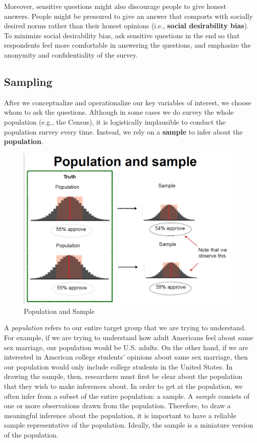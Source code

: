 \documentclass{book}
\begin{document}
Moreover, sensitive questions might also discourage people to give honest
answers. People might be pressured to give an answer that comports with
socially desired norms rather than their honest opinions (i.e., \textbf{social
desirability bias}). To minimize social desirability bias, ask sensitive
questions in the end so that respondents feel more comfortable in answering
the questions, and emphasize the anonymity and confidentiality of the survey.

\hypertarget{sampling}{%
\subsection{Sampling}\label{sampling}}

After we conceptualize and operationalize our key variables of interest, we
choose whom to ask the questions. Although in some cases we do survey the
whole population (e.g., the Census), it is logistically implausible to conduct
the population survey every time. Instead, we rely on a \textbf{sample} to
infer about the \textbf{population}.

\begin{figure}
\hypertarget{fig:population_sample}{%
\centering
\includegraphics{images/surveys/population_sample.png}
\caption{Population and Sample}\label{fig:population_sample}
}
\end{figure}

A \emph{population} refers to our entire target group that we are trying to
understand. For example, if we are trying to understand how adult Americans
feel about same sex marriage, our population would be U.S. adults. On the
other hand, if we are interested in American college students' opinions about
same sex marriage, then our population would only include college students in
the United States. In drawing the sample, then, researchers must first be
clear about the population that they wish to make inferences about. In order
to get at the population, we often infer from a subset of the entire
population: a sample. A \emph{sample} consists of one or more observations
drawn from the population. Therefore, to draw a meaningful inference about the
population, it is important to have a reliable sample representative of the
population. Ideally, the sample is a miniature version of the population.
\end{document}
